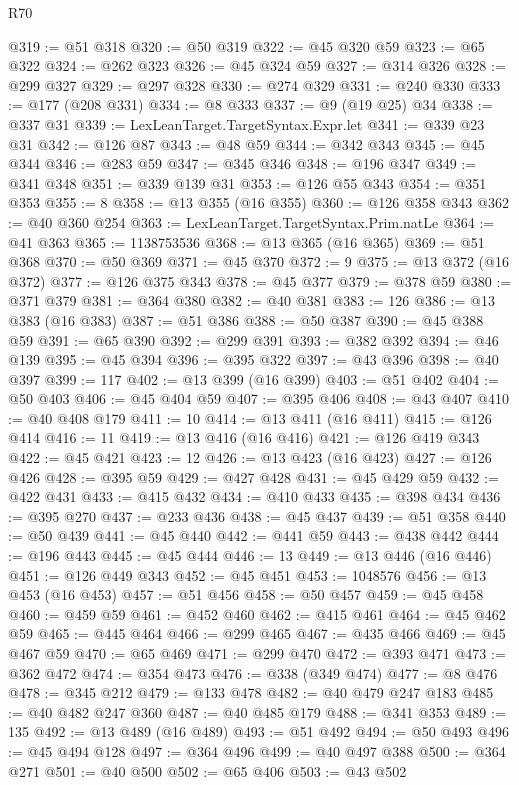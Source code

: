 \begin{lexlean}{R70}
\begin{coremodule}
@319 := @51 @318
@320 := @50 @319
@322 := @45 @320 @59
@323 := @65 @322
@324 := @262 @323
@326 := @45 @324 @59
@327 := @314 @326
@328 := @299 @327
@329 := @297 @328
@330 := @274 @329
@331 := @240 @330
@333 := @177 (@208 @331)
@334 := @8 @333
@337 := @9 (@19 @25) @34
@338 := @337 @31
@339 := LexLeanTarget.TargetSyntax.Expr.let
@341 := @339 @23 @31
@342 := @126 @87
@343 := @48 @59
@344 := @342 @343
@345 := @45 @344
@346 := @283 @59
@347 := @345 @346
@348 := @196 @347
@349 := @341 @348
@351 := @339 @139 @31
@353 := @126 @55 @343
@354 := @351 @353
@355 := 8
@358 := @13 @355 (@16 @355)
@360 := @126 @358 @343
@362 := @40 @360 @254
@363 := LexLeanTarget.TargetSyntax.Prim.natLe
@364 := @41 @363
@365 := 1138753536
@368 := @13 @365 (@16 @365)
@369 := @51 @368
@370 := @50 @369
@371 := @45 @370
@372 := 9
@375 := @13 @372 (@16 @372)
@377 := @126 @375 @343
@378 := @45 @377
@379 := @378 @59
@380 := @371 @379
@381 := @364 @380
@382 := @40 @381
@383 := 126
@386 := @13 @383 (@16 @383)
@387 := @51 @386
@388 := @50 @387
@390 := @45 @388 @59
@391 := @65 @390
@392 := @299 @391
@393 := @382 @392
@394 := @46 @139
@395 := @45 @394
@396 := @395 @322
@397 := @43 @396
@398 := @40 @397
@399 := 117
@402 := @13 @399 (@16 @399)
@403 := @51 @402
@404 := @50 @403
@406 := @45 @404 @59
@407 := @395 @406
@408 := @43 @407
@410 := @40 @408 @179
@411 := 10
@414 := @13 @411 (@16 @411)
@415 := @126 @414
@416 := 11
@419 := @13 @416 (@16 @416)
@421 := @126 @419 @343
@422 := @45 @421
@423 := 12
@426 := @13 @423 (@16 @423)
@427 := @126 @426
@428 := @395 @59
@429 := @427 @428
@431 := @45 @429 @59
@432 := @422 @431
@433 := @415 @432
@434 := @410 @433
@435 := @398 @434
@436 := @395 @270
@437 := @233 @436
@438 := @45 @437
@439 := @51 @358
@440 := @50 @439
@441 := @45 @440
@442 := @441 @59
@443 := @438 @442
@444 := @196 @443
@445 := @45 @444
@446 := 13
@449 := @13 @446 (@16 @446)
@451 := @126 @449 @343
@452 := @45 @451
@453 := 1048576
@456 := @13 @453 (@16 @453)
@457 := @51 @456
@458 := @50 @457
@459 := @45 @458
@460 := @459 @59
@461 := @452 @460
@462 := @415 @461
@464 := @45 @462 @59
@465 := @445 @464
@466 := @299 @465
@467 := @435 @466
@469 := @45 @467 @59
@470 := @65 @469
@471 := @299 @470
@472 := @393 @471
@473 := @362 @472
@474 := @354 @473
@476 := @338 (@349 @474)
@477 := @8 @476
@478 := @345 @212
@479 := @133 @478
@482 := @40 @479 @247 @183
@485 := @40 @482 @247 @360
@487 := @40 @485 @179
@488 := @341 @353
@489 := 135
@492 := @13 @489 (@16 @489)
@493 := @51 @492
@494 := @50 @493
@496 := @45 @494 @128
@497 := @364 @496
@499 := @40 @497 @388
@500 := @364 @271
@501 := @40 @500
@502 := @65 @406
@503 := @43 @502

\end{coremodule}
\end{lexlean}
